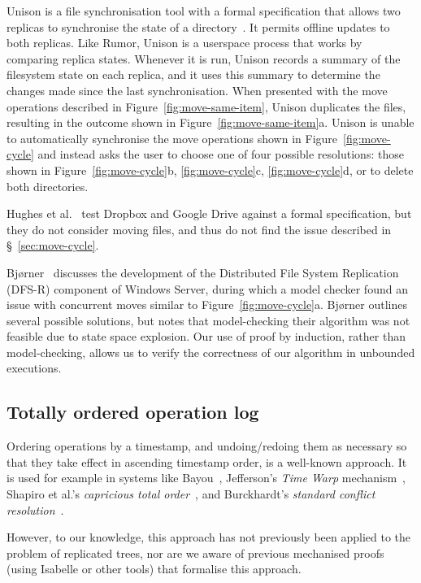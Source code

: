 \documentclass[sigplan,anonymous]{acmart}
\begin{document}
Unison is a file synchronisation tool with a formal specification that allows two replicas to synchronise the state of a directory~\cite{PierceVouillon:UnisonSpecTR}.
It permits offline updates to both replicas.
Like Rumor, Unison is a userspace process that works by comparing replica states.
Whenever it is run, Unison records a summary of the filesystem state on each replica, and it uses this summary to determine the changes made since the last synchronisation. 
When presented with the move operations described in Figure~\ref{fig:move-same-item}, Unison duplicates the files, resulting in the outcome shown in Figure~\ref{fig:move-same-item}a. 
Unison is unable to automatically synchronise the move operations shown in Figure~\ref{fig:move-cycle} and instead asks the user to choose one of four possible resolutions: those shown in Figure~\ref{fig:move-cycle}b, \ref{fig:move-cycle}c, \ref{fig:move-cycle}d, or to delete both directories.

Hughes et al.~\cite{Hughes:2016fp} test Dropbox and Google Drive against a formal specification, but they do not consider moving files, and thus do not find the issue described in \S~\ref{sec:move-cycle}.

Bj{\o}rner~\cite{Bjorner:2007hp} discusses the development of the Distributed File System Replication (DFS-R) component of Windows Server, during which a model checker found an issue with concurrent moves similar to Figure~\ref{fig:move-cycle}a.
Bj{\o}rner outlines several possible solutions, but notes that model-checking their algorithm was not feasible due to state space explosion.
Our use of proof by induction, rather than model-checking, allows us to verify the correctness of our algorithm in unbounded executions.

\subsection{Totally ordered operation log}

Ordering operations by a timestamp, and undoing/redoing them as necessary so that they take effect in ascending timestamp order, is a well-known approach.
It is used for example in systems like Bayou~\cite{Terry:1995dn}, Jefferson's \emph{Time Warp} mechanism~\cite{Jefferson:1985em}, Shapiro et al.'s \emph{capricious total order}~\cite{Shapiro:2016hp}, and Burckhardt's \emph{standard conflict resolution}~\cite[\S~4.3.3]{Burckhardt:2014hy}.

However, to our knowledge, this approach has not previously been applied to the problem of replicated trees, nor are we aware of previous mechanised proofs (using Isabelle or other tools) that formalise this approach.
\end{document}
